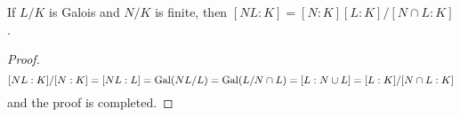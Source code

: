 \begin{remark}
  If $L/K$ is Galois and $N/K$ is finite, then $[NL: K] = [N: K][L: K] / [N \cap L: K]$.
  \begin{proof}
    \[ [NL: K]/[N:K] = [NL: L] = \operatorname{Gal}(NL/L) = \operatorname{Gal}(L / N \cap L) = [L: N \cup L] = [L: K]/[N \cap L: K] \]
    and the proof is completed.
  \end{proof}
\end{remark}

